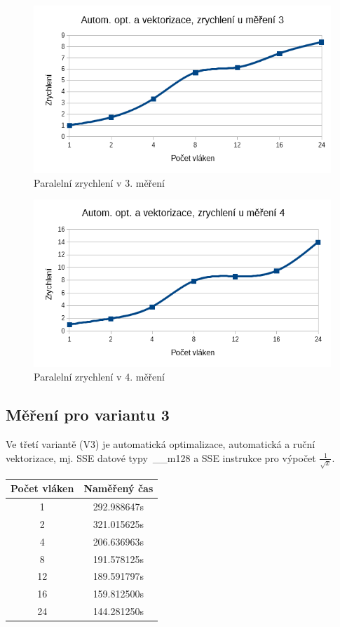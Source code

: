 \documentclass[12pt]{article}
\begin{document}
\begin{figure}
  \begin{center}
     \includegraphics[width=12cm]{images/auto3acc.png}
    \caption{Paralelní zrychlení v 3. měření} 
  \end{center}
\end{figure}

\begin{figure}[H]
  \begin{center}
     \includegraphics[width=12cm]{images/auto4acc.png}
    \caption{Paralelní zrychlení v 4. měření} 
  \end{center}
\end{figure}

\subsection{Měření pro variantu 3}
Ve třetí variantě (V3) je automatická optimalizace, automatická a ruční vektorizace, mj. SSE datové typy~\_\_m128 a SSE in\-struk\-ce pro výpočet ${\frac{1}{\sqrt{x}}}$.
%
%
\begin{center}
\begin{tabular}{ c | c }
\textbf{Počet vláken} & \textbf{Naměřený čas} \\ \hline \hline 
1 & 292.988647s \\ \hline
2 & 321.015625s \\ \hline
4 & 206.636963s \\ \hline
8 & 191.578125s \\ \hline
12 & 189.591797s \\ \hline
16 & 159.812500s \\ \hline
24 & 144.281250s \\ \hline
\end{tabular}
\end{center}
\end{document}
